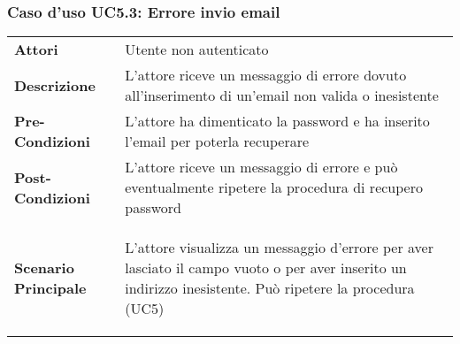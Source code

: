 \subsubsection{Caso d'uso UC5.3: Errore invio email}
\label{UC5_3}

\begin{minipage}{\linewidth}
\begin{longtable}{ l | p{11cm}}
	\hline
	\rowcolor{Gray}
	 \multicolumn{2}{c}{UC5.3 - Errore invio email} \\
	 \hline
	\textbf{Attori} & Utente non autenticato \\
	\textbf{Descrizione} & L'attore riceve un messaggio di errore dovuto all'inserimento di un'email non valida o inesistente \\
	\textbf{Pre-Condizioni} & L'attore ha dimenticato la password e ha inserito l'email per poterla recuperare \\
	\textbf{Post-Condizioni} & L'attore riceve un messaggio di errore e può eventualmente ripetere la procedura di recupero password \\
	\textbf{Scenario Principale} & \begin{enumerate*}[label=(\arabic*.),itemjoin={\newline}]
		\item L'attore visualizza un messaggio d'errore per aver lasciato il campo vuoto o per aver inserito un indirizzo inesistente. Può ripetere la procedura (UC5)
	\end{enumerate*}\\
\end{longtable}
\end{minipage}
